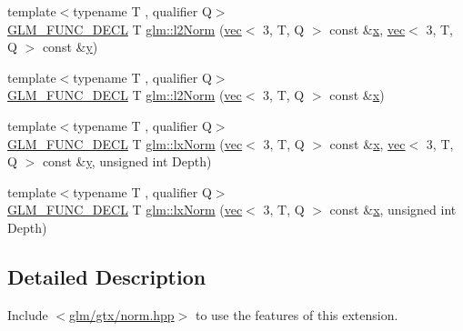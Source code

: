 \begin{DoxyCompactItemize}
\item 
{\footnotesize template$<$typename T , qualifier Q$>$ }\\\mbox{\hyperlink{setup_8hpp_ab2d052de21a70539923e9bcbf6e83a51}{G\+L\+M\+\_\+\+F\+U\+N\+C\+\_\+\+D\+E\+CL}} T \mbox{\hyperlink{group__gtx__norm_ga41340b2ef40a9307ab0f137181565168}{glm\+::l2\+Norm}} (\mbox{\hyperlink{structglm_1_1vec}{vec}}$<$ 3, T, Q $>$ const \&\mbox{\hyperlink{_s_d_l__opengl_8h_ad0e63d0edcdbd3d79554076bf309fd47}{x}}, \mbox{\hyperlink{structglm_1_1vec}{vec}}$<$ 3, T, Q $>$ const \&\mbox{\hyperlink{_s_d_l__opengl_8h_a1675d9d7bb68e1657ff028643b4037e3}{y}})
\item 
{\footnotesize template$<$typename T , qualifier Q$>$ }\\\mbox{\hyperlink{setup_8hpp_ab2d052de21a70539923e9bcbf6e83a51}{G\+L\+M\+\_\+\+F\+U\+N\+C\+\_\+\+D\+E\+CL}} T \mbox{\hyperlink{group__gtx__norm_gae288bde8f0e41fb4ed62e65137b18cba}{glm\+::l2\+Norm}} (\mbox{\hyperlink{structglm_1_1vec}{vec}}$<$ 3, T, Q $>$ const \&\mbox{\hyperlink{_s_d_l__opengl_8h_ad0e63d0edcdbd3d79554076bf309fd47}{x}})
\item 
{\footnotesize template$<$typename T , qualifier Q$>$ }\\\mbox{\hyperlink{setup_8hpp_ab2d052de21a70539923e9bcbf6e83a51}{G\+L\+M\+\_\+\+F\+U\+N\+C\+\_\+\+D\+E\+CL}} T \mbox{\hyperlink{group__gtx__norm_gacad23d30497eb16f67709f2375d1f66a}{glm\+::lx\+Norm}} (\mbox{\hyperlink{structglm_1_1vec}{vec}}$<$ 3, T, Q $>$ const \&\mbox{\hyperlink{_s_d_l__opengl_8h_ad0e63d0edcdbd3d79554076bf309fd47}{x}}, \mbox{\hyperlink{structglm_1_1vec}{vec}}$<$ 3, T, Q $>$ const \&\mbox{\hyperlink{_s_d_l__opengl_8h_a1675d9d7bb68e1657ff028643b4037e3}{y}}, unsigned int Depth)
\item 
{\footnotesize template$<$typename T , qualifier Q$>$ }\\\mbox{\hyperlink{setup_8hpp_ab2d052de21a70539923e9bcbf6e83a51}{G\+L\+M\+\_\+\+F\+U\+N\+C\+\_\+\+D\+E\+CL}} T \mbox{\hyperlink{group__gtx__norm_gac61b6d81d796d6eb4d4183396a19ab91}{glm\+::lx\+Norm}} (\mbox{\hyperlink{structglm_1_1vec}{vec}}$<$ 3, T, Q $>$ const \&\mbox{\hyperlink{_s_d_l__opengl_8h_ad0e63d0edcdbd3d79554076bf309fd47}{x}}, unsigned int Depth)
\end{DoxyCompactItemize}


\subsection{Detailed Description}
Include $<$\mbox{\hyperlink{norm_8hpp}{glm/gtx/norm.\+hpp}}$>$ to use the features of this extension.

